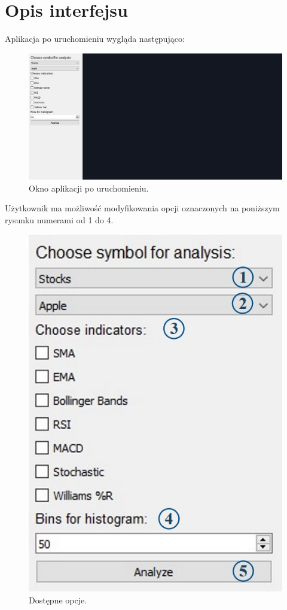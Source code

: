 \documentclass[12pt]{article}
\begin{document}
    \newpage


    \section{Opis interfejsu}\label{sec:opis-interfejsu}

    Aplikacja po uruchomieniu wygląda następująco:

    \begin{figure}[H]
        \centering
        \includegraphics[scale=0.4]{pics/po_odpaleniu}
        \caption{Okno aplikacji po uruchomieniu.}\label{fig:figure}
	\end{figure}

    Użytkownik ma możliwość modyfikowania opcji oznaczonych na poniższym rysunku numerami od 1 do 4.

    \begin{figure}[H]
        \centering
        \includegraphics[scale=0.4]{pics/opcje}
        \caption{Dostępne opcje.}\label{fig:figure2}
	\end{figure}
\end{document}
